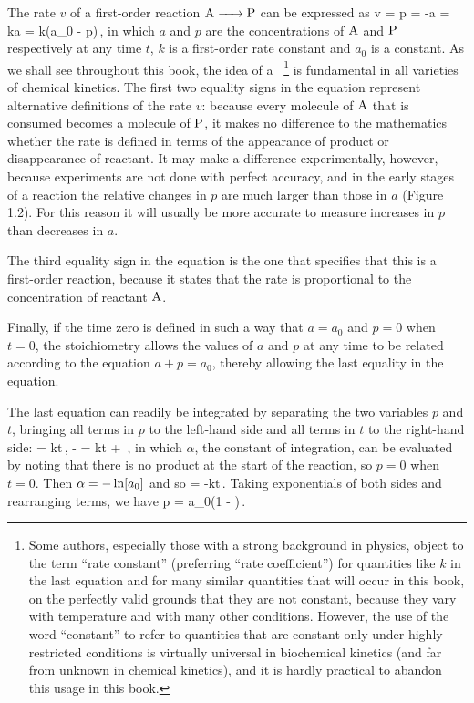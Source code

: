The rate $v$ of a first-order reaction $\ce{A -> P}$ can be expressed as 
\beq
v = \dt p = -\dt a = ka = k(a_0 - p)\,,
\eeq
in which $a$ and $p$ are the concentrations of $\ce A$ and $\ce P$ respectively at any time $t$, $k$ is a first-order rate constant and $a_0$ is a constant. As we shall see throughout this book, the idea of a ~\footnote{Some authors, especially those with a strong background in physics, object to the term ``rate constant'' (preferring ``rate coefficient'') for quantities like $k$ in the last equation and for many similar quantities that will occur in this book, on the perfectly valid grounds that they are not constant, because they vary with temperature and with many other conditions. However, the use of the word ``constant'' to refer to quantities that are constant only under highly restricted conditions is virtually universal in biochemical kinetics (and far from unknown in chemical kinetics), and it is hardly practical to abandon this usage in this book.}
is fundamental in all varieties of chemical kinetics. The first two equality signs in the equation represent alternative definitions of the rate $v$: because every molecule of $\ce A$ that is consumed becomes a molecule of $\ce P$, it makes no difference to the mathematics whether the rate is defined in terms of the appearance of product or disappearance of reactant. It may make a difference experimentally, however, because experiments are not done with perfect accuracy, and in the early stages of a reaction the relative changes in $p$ are much larger than those in $a$ (Figure 1.2). For this reason it will usually be more accurate to measure increases in $p$ than decreases in $a$.

The third equality sign in the equation is the one that specifies that this is a first-order reaction, because it states that the rate is proportional to the concentration of reactant $\ce A$.

Finally, if the time zero is defined in such a way that $a = a_0$ and $p = 0$ when $t = 0$, the stoichiometry allows the values of $a$ and $p$ at any time to be related according to the equation $a + p = a_0$, thereby allowing the last equality in the equation.

The last equation can readily be integrated by separating the two variables $p$ and $t$, bringing all terms in $p$ to the left-hand side and all terms in $t$ to the right-hand side:
\beq
\int {} = \int k\dx t\,,\implies
- \ln{} = kt + \alpha\,,
\eeq
in which $\alpha$, the constant of integration, can be evaluated by noting that there is no product at the start of the reaction, so $p = 0$ when $t = 0$. Then $\alpha = -\ln\!\left[{a_0}\right]$ and so
\beq
\ln{} = -kt\,.
\eeq
Taking exponentials of both sides and rearranging terms, we have
\beq
p = a_0\left(1 - \exp{}\right)\,.
\eeq

